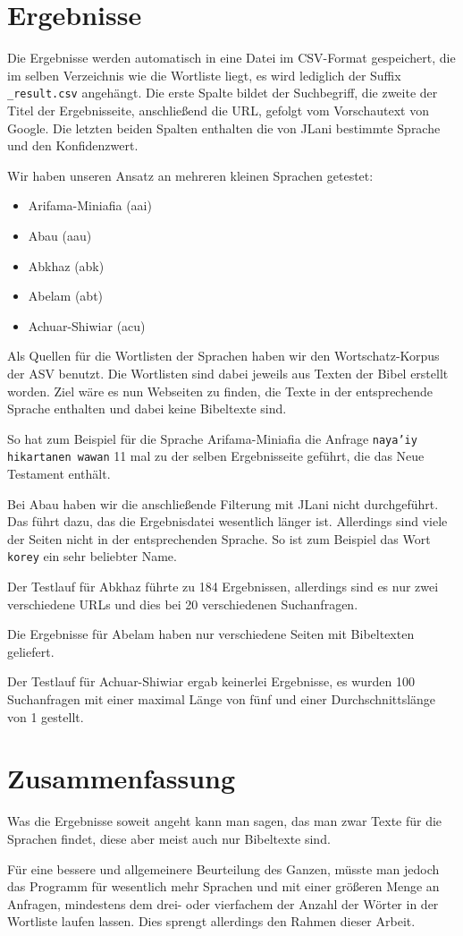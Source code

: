\documentclass[a4paper, 12pt]{article}
\begin{document}
\section{Ergebnisse}
Die Ergebnisse werden automatisch in eine Datei im CSV-Format gespeichert, die im selben Verzeichnis wie die Wortliste liegt, es wird lediglich der Suffix \texttt{\_result.csv} angehängt. Die erste Spalte bildet der Suchbegriff, die zweite der Titel der Ergebnisseite, anschließend die URL, gefolgt vom Vorschautext von Google. Die letzten beiden Spalten enthalten die von JLani bestimmte Sprache und den Konfidenzwert.

Wir haben unseren Ansatz an mehreren kleinen Sprachen getestet:
\begin{itemize}
\item Arifama-Miniafia (aai)
\item Abau (aau)
\item Abkhaz (abk)
\item Abelam (abt)
\item Achuar-Shiwiar (acu)
\end{itemize}

Als Quellen für die Wortlisten der Sprachen haben wir den Wortschatz-Korpus der ASV benutzt. Die Wortlisten sind dabei jeweils aus Texten der Bibel erstellt worden. Ziel wäre es nun Webseiten zu finden, die Texte in der entsprechende Sprache enthalten und dabei keine Bibeltexte sind.

So hat zum Beispiel für die Sprache Arifama-Miniafia die Anfrage \texttt{naya’iy hikartanen wawan} 11 mal zu der selben Ergebnisseite geführt, die das Neue Testament enthält.

Bei Abau haben wir die anschließende Filterung mit JLani nicht durchgeführt. Das führt dazu, das die Ergebnisdatei wesentlich länger ist. Allerdings sind viele der Seiten nicht in der entsprechenden Sprache. So ist zum Beispiel das Wort \texttt{korey} ein sehr beliebter Name.

Der Testlauf für Abkhaz führte zu 184 Ergebnissen, allerdings sind es nur zwei verschiedene URLs und dies bei 20 verschiedenen Suchanfragen.

Die Ergebnisse für Abelam haben nur verschiedene Seiten mit Bibeltexten geliefert.

Der Testlauf für Achuar-Shiwiar ergab keinerlei Ergebnisse, es wurden 100 Suchanfragen mit einer maximal Länge von fünf und einer Durchschnittslänge von 1 gestellt.

\section{Zusammenfassung}
Was die Ergebnisse soweit angeht kann man sagen, das man zwar Texte für die Sprachen findet, diese aber meist auch nur Bibeltexte sind.

Für eine bessere und allgemeinere Beurteilung des Ganzen, müsste man jedoch das Programm für wesentlich mehr Sprachen und mit einer größeren Menge an Anfragen, mindestens dem drei- oder vierfachem der Anzahl der Wörter in der Wortliste laufen lassen. Dies sprengt allerdings den Rahmen dieser Arbeit.
\end{document}
